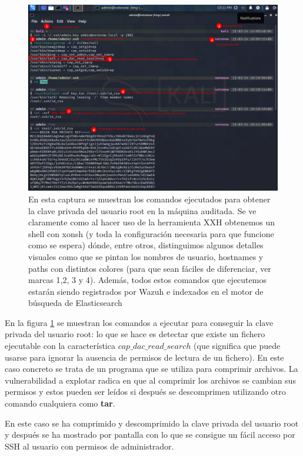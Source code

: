\begin{figure}[!hbt]
  \centering
  \includegraphics[width=\textwidth]{imagenes/get_root_key.png}
  \caption{En esta captura se muestran los comandos ejecutados para obtener la clave privada del usuario root en la máquina auditada. Se ve claramente como al hacer uso de la herramienta XXH obtenemos un shell con xonsh (y toda la configuración necesaria para que funcione como se espera) dónde, entre otros, distinguimos algunos detalles visuales como que se pintan los nombres de usuario, hostnames y paths con distintos colores (para que sean fáciles de diferenciar, ver marcas 1,2, 3 y 4). Además, todos estos comandos que ejecutemos estarán siendo registrados por Wazuh e indexados en el motor de búsqueda de Elasticsearch}
   \label{getroot}
\end{figure}

En la figura \ref{getroot} se muestran los comandos a ejecutar para conseguir la clave privada del usuario root: lo que se hace es detectar que existe un fichero ejecutable con la característica $cap\_dac\_read\_search$ (que significa que puede usarse para ignorar la ausencia de permisos de lectura de un fichero). En este caso concreto se trata de un programa que se utiliza para comprimir archivos. La vulnerabilidad a explotar radica en que al comprimir los archivos se cambian sus permisos y estos pueden ser leídos si después se descomprimen utilizando otro comando cualquiera como \textbf{tar}.

En este caso se ha comprimido y descomprimido la clave privada del usuario root y después se ha mostrado por pantalla con lo que se consigue un fácil acceso por SSH al usuario con permisos de administrador.


